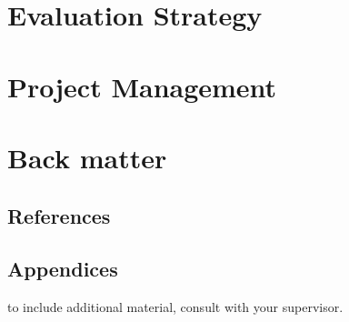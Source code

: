 \documentclass[11pt]{article}
\begin{document}
\pagebreak
\section{Evaluation Strategy}


\pagebreak
\section{Project Management}


\pagebreak
\appendix
\section{Back matter}
\subsection{References}
\printbibliography

\subsection{Appendices}
to include additional material, consult with your supervisor.
\end{document}
